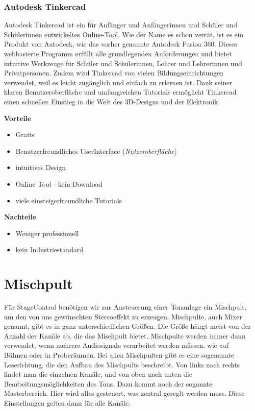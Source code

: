 \subsubsection{Autodesk Tinkercad}
Autodesk Tinkercad ist ein für Anfänger und Anfängerinnen und Schüler und Schülerinnen entwickeltes Online-Tool. Wie der Name es schon verrät, ist es ein Produkt von Autodesk, wie das vorher genannte Autodesk Fusion 360. Dieses webbasierte Programm erfüllt alle grundlegenden Anforderungen und bietet intuitive Werkzeuge für Schüler und Schülerinnen, Lehrer und Lehrerinnen und Privatpersonen. Zudem wird Tinkercad von vielen Bildungseinrichtungen verwendet, weil es leicht zugänglich und einfach zu erlernen ist. Dank seiner klaren Benutzeroberfläche und umfangreichen Tutorials ermöglicht Tinkercad einen schnellen Einstieg in die Welt des 3D-Designs und der Elektronik. \\
\cite{Tinkercad}

\textbf{Vorteile}
\begin{itemize}
	\item Gratis
	\item Benutzerfreundliches UserInterface (\emph{Nutzeroberfläche})
	\item intuitives Design
	\item Online Tool - kein Download 	
	\item viele einsteigerfreundliche Tutorials 
\end{itemize}

\textbf{Nachteile}
\begin{itemize}
	\item Weniger professionell
	\item kein Industriestandard 
\end{itemize}
\cite{TinkercadReviews}

\section{Mischpult}
 Für StageControl benötigen wir zur Ansteuerung einer Tonanlage ein Mischpult, um den von uns gewünschten Stereoeffekt zu erzeugen. Mischpulte, auch Mixer genannt, gibt es in ganz unterschiedlichen Größen. Die Größe hängt meist von der Anzahl der Kanäle ab, die das Mischpult bietet. Mischpulte werden immer dann verwendet, wenn mehrere Audiosignale verarbeitet werden müssen, wie auf Bühnen oder in Proberäumen. Bei allen Mischpulten gibt es eine sogenannte Leserichtung, die den Aufbau des Mischpults beschreibt. Von links nach rechts findet man die einzelnen Kanäle, und von oben nach unten die Bearbeitungsmöglichkeiten des Tons. Dazu kommt noch der sogannte Masterbereich. Hier wird alles gesteuert, was zentral gereglt werden muss. Diese Einstellungen gelten dann für alle Kanäle. \\
\cite{Mischpult_Information}  \cite{Mischpult_Master}

